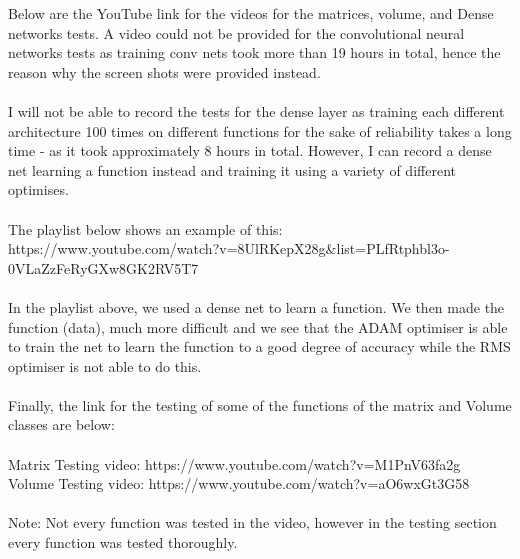 Below are the YouTube link for the videos for the matrices, volume, and Dense networks tests. A video could not be provided for the convolutional neural networks tests as training conv nets took more than 19 hours in total, hence the reason why the screen shots were provided instead.
\\ \\
I will not be able to record the tests for the dense layer as training each different architecture 100 times on different functions for the sake of reliability takes a long time - as it took approximately 8 hours in total. However, I can record a dense net learning a function instead and training it using a variety of different optimises. 
\\ \\
The playlist below shows an example of this: 
\\
https://www.youtube.com/watch?v=8UlRKepX28g\&list=PLfRtphbl3o-0VLaZzFeRyGXw8GK2RV5T7
\\ \\
In the playlist above, we used a dense net to learn a function. We then made the function (data), much more difficult and we see that the ADAM optimiser is able to train the net to learn the function to a good degree of accuracy while the RMS optimiser is not able to do this.
\\ \\
Finally, the link for the testing of some of the functions of the matrix and Volume classes are below:
\\ \\
Matrix Testing video: https://www.youtube.com/watch?v=M1PnV63fa2g
\\
Volume Testing video: https://www.youtube.com/watch?v=aO6wxGt3G58
\\ \\
Note: Not every function was tested in the video, however in the testing section every function was tested thoroughly.
